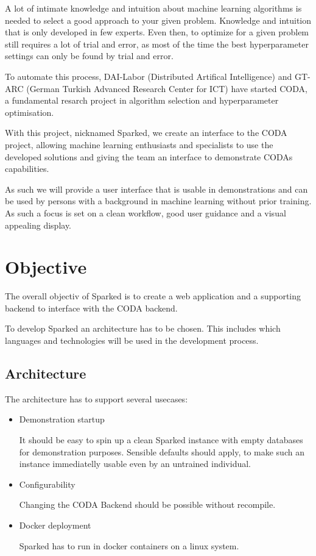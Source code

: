 \documentclass[12pt,a4paper,titlepage,oneside,BCOR1cm]{scrreprt}
\begin{document}
A lot of intimate knowledge and intuition about machine learning algorithms is needed to select a good approach to your given problem. Knowledge and intuition that is only developed in few experts. Even then, to optimize for a given problem still requires a lot of trial and error, as most of the time the best hyperparameter settings can only be found by trial and error.

To automate this process, DAI-Labor (Distributed Artifical Intelligence) and GT-ARC (German Turkish Advanced Research Center for ICT) have started CODA, a fundamental resarch project in algorithm selection and hyperparameter optimisation. \cite{CODA-Steckbrief}

With this project, nicknamed Sparked, we create an interface to the CODA project, allowing machine learning enthusiasts and specialists to use the developed solutions and giving the team an interface to demonstrate CODAs capabilities.

As such we will provide a user interface that is usable in demonstrations and can be used by persons with a background in machine learning without prior training. As such a focus is set on a clean workflow, good user guidance and a visual appealing display.






\chapter{Objective}
The overall objectiv of Sparked is to create a web application and a supporting backend to interface with the CODA backend. 

To develop Sparked an architecture has to be chosen. This includes which languages and technologies will be used in the development process. 

\section{Architecture}

The architecture has to support several usecases:
\begin{itemize}
  \item Demonstration startup
  
  It should be easy to spin up a clean Sparked instance with empty databases for demonstration purposes. Sensible defaults should apply, to make such an instance immediatelly usable even by an untrained individual.

  \item Configurability

  Changing the CODA Backend should be possible without recompile.

  \item Docker deployment

  Sparked has to run in docker containers on a linux system.

\end{itemize}
\end{document}
